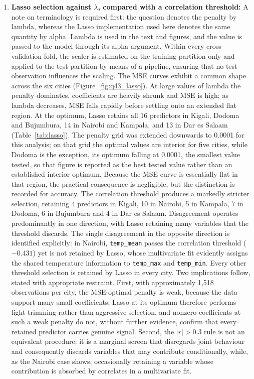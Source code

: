 \documentclass[conference]{IEEEtran}
\begin{document}
\begin{enumerate}
    \item \textbf{Lasso selection against $\lambda$, compared with a correlation threshold:} A note on terminology is required first: the question denotes the penalty by lambda, whereas the Lasso implementation used here denotes the same quantity by alpha. Lambda is used in the text and figures, and the value is passed to the model through its alpha argument. Within every cross-validation fold, the scaler is estimated on the training partition only and applied to the test partition by means of a pipeline, ensuring that no test observation influences the scaling. The MSE curves exhibit a common shape across the six cities (Figure~\ref{fig:q43_lasso}). At large values of lambda the penalty dominates, coefficients are heavily shrunk and MSE is high; as lambda decreases, MSE falls rapidly before settling onto an extended flat region. At the optimum, Lasso retains all 16 predictors in Kigali, Dodoma and Bujumbura, 14 in Nairobi and Kampala, and 13 in Dar es Salaam (Table~\ref{tab:lasso}). The penalty grid was extended downwards to 0.0001 for this analysis; on that grid the optimal values are interior for five cities, while Dodoma is the exception, its optimum falling at 0.0001, the smallest value tested, so that figure is reported as the best tested value rather than an established interior optimum. Because the MSE curve is essentially flat in that region, the practical consequence is negligible, but the distinction is recorded for accuracy. The correlation threshold produces a markedly stricter selection, retaining 4 predictors in Kigali, 10 in Nairobi, 5 in Kampala, 7 in Dodoma, 6 in Bujumbura and 4 in Dar es Salaam. Disagreement operates predominantly in one direction, with Lasso retaining many variables that the threshold discards. The single disagreement in the opposite direction is identified explicitly: in Nairobi, \texttt{temp\_mean} passes the correlation threshold ($-0.431$) yet is not retained by Lasso, whose multivariate fit evidently assigns the shared temperature information to \texttt{temp\_max} and \texttt{temp\_min}. Every other threshold selection is retained by Lasso in every city. Two implications follow, stated with appropriate restraint. First, with approximately 1{,}518 observations per city, the MSE-optimal penalty is weak, because the data support many small coefficients; Lasso at its optimum therefore performs light trimming rather than aggressive selection, and nonzero coefficients at such a weak penalty do not, without further evidence, confirm that every retained predictor carries genuine signal. Second, the $|r| > 0.3$ rule is not an equivalent procedure: it is a marginal screen that disregards joint behaviour and consequently discards variables that may contribute conditionally, while, as the Nairobi case shows, occasionally retaining a variable whose contribution is absorbed by correlates in a multivariate fit.


\end{enumerate}
\end{document}
